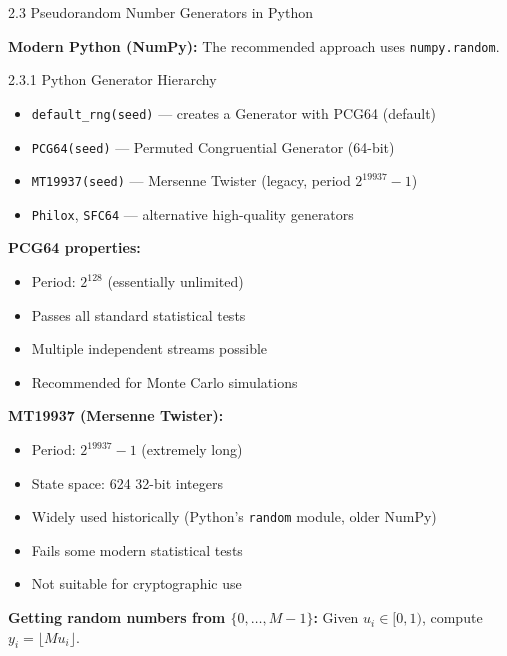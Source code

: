 \documentclass[aspectratio=169,10pt]{beamer}
\begin{document}
\begin{frame}[allowframebreaks]{2.3 Pseudorandom Number Generators in Python}

\textbf{Modern Python (NumPy):} The recommended approach uses \texttt{numpy.random}.

\medskip
\begin{block}{2.3.1 Python Generator Hierarchy}
\begin{itemize}
  \item \texttt{default\_rng(seed)} --- creates a Generator with PCG64 (default)
  \item \texttt{PCG64(seed)} --- Permuted Congruential Generator (64-bit)
  \item \texttt{MT19937(seed)} --- Mersenne Twister (legacy, period $2^{19937}-1$)
  \item \texttt{Philox}, \texttt{SFC64} --- alternative high-quality generators
\end{itemize}
\end{block}

\medskip
\textbf{PCG64 properties:}
\begin{itemize}
  \item Period: $2^{128}$ (essentially unlimited)
  \item Passes all standard statistical tests
  \item Multiple independent streams possible
  \item Recommended for Monte Carlo simulations
\end{itemize}

\framebreak

\textbf{MT19937 (Mersenne Twister):}
\begin{itemize}
  \item Period: $2^{19937} - 1$ (extremely long)
  \item State space: 624 32-bit integers
  \item Widely used historically (Python's \texttt{random} module, older NumPy)
  \item Fails some modern statistical tests
  \item Not suitable for cryptographic use
\end{itemize}

\medskip
\textbf{Getting random numbers from $\{0,\ldots,M-1\}$:}
Given $u_i \in [0,1)$, compute $y_i = \lfloor M u_i \rfloor$.

\end{frame}
\end{document}
